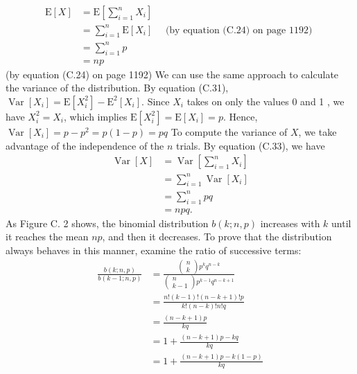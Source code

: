 \documentclass[lang=cn,newtx,10pt,scheme=chinese]{elegantbook}
\begin{document}
$$
\begin{aligned}
\mathrm{E}[X] & =\mathrm{E}\left[\sum_{i=1}^n X_i\right] \\
& =\sum_{i=1}^n \mathrm{E}\left[X_i\right] \quad \text { (by equation (C.24) on page 1192) } \\
& =\sum_{i=1}^n p \\
& =n p
\end{aligned}
$$
(by equation (C.24) on page 1192)
We can use the same approach to calculate the variance of the distribution. By equation (C.31), $\operatorname{Var}\left[X_i\right]=\mathrm{E}\left[X_i^2\right]-\mathrm{E}^2\left[X_i\right]$. Since $X_i$ takes on only the values 0 and 1 , we have $X_i^2=X_i$, which implies $\mathrm{E}\left[X_i^2\right]=\mathrm{E}\left[X_i\right]=p$. Hence,
$\operatorname{Var}\left[X_i\right]=p-p^2=p(1-p)=p q$
To compute the variance of $X$, we take advantage of the independence of the $n$ trials. By equation (C.33), we have
$$
\begin{aligned}
\operatorname{Var}[X] & =\operatorname{Var}\left[\sum_{i=1}^n X_i\right] \\
& =\sum_{i=1}^n \operatorname{Var}\left[X_i\right] \\
& =\sum_{i=1}^n p q \\
& =n p q .
\end{aligned}
$$
As Figure C. 2 shows, the binomial distribution $b(k ; n, p)$ increases with $k$ until it reaches the mean $n p$, and then it decreases. To prove that the distribution always behaves in this manner, examine the ratio of successive terms:
$$
\begin{aligned}
\frac{b(k ; n, p)}{b(k-1 ; n, p)} & =\frac{\left(\begin{array}{c}
n \\
k
\end{array}\right) p^k q^{n-k}}{\left(\begin{array}{c}
n \\
k-1
\end{array}\right) p^{k-1} q^{n-k+1}} \\
& =\frac{n !(k-1) !(n-k+1) ! p}{k !(n-k) ! n ! q} \\
& =\frac{(n-k+1) p}{k q} \\
& =1+\frac{(n-k+1) p-k q}{k q} \\
& =1+\frac{(n-k+1) p-k(1-p)}{k q}
\end{aligned}
$$
\end{document}

